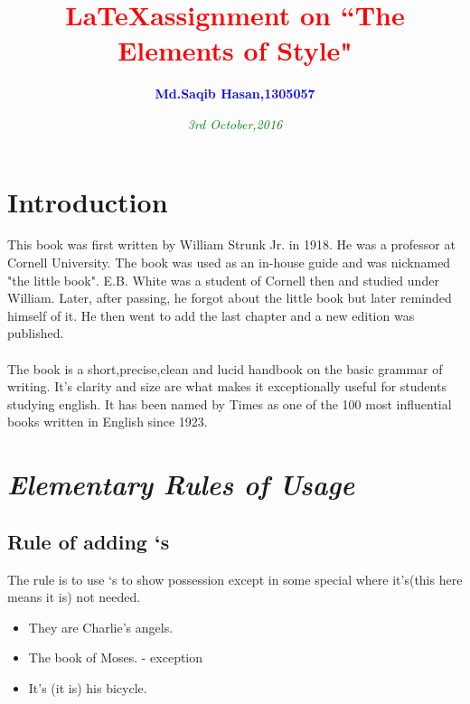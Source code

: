 \documentclass{report}
\begin{document}
\newcommand{\stylus}[1]{\textbf{\textit{#1}}}
\newcommand{\style}[2]{\textcolor{red}{#1} \textcolor{blue}{#2}}

\title{\textcolor{red}{\LaTeX assignment on ``The Elements of Style"}}
\author{\textcolor{blue}{\textbf{Md.Saqib Hasan,1305057}}}
\date{\textcolor{green}{\textit{3rd October,2016}}}
\maketitle
\newpage





\tableofcontents



\chapter{Introduction}
This book was first written by William Strunk Jr. in 1918. He was a professor at Cornell University. The book was used as an in-house guide and was nicknamed "the little book". E.B. White was a student of Cornell then and studied under William. Later, after passing, he forgot about the little book but later reminded himself of it. He then went to add the last chapter and a new edition was published.
\\
\\
The book is a short,precise,clean and lucid handbook on the basic grammar of writing. It's clarity and size are what makes it exceptionally useful for students studying english. It has been named by Times as one of the 100 most influential books written in English since 1923.



\chapter{\stylus{Elementary Rules of Usage}}
\section{Rule of adding `s}
The rule is to use `s to show possession except in some special where it's(this here means it is) not needed.
\begin{itemize}
\item They are Charlie's angels.
\item The book of Moses. - exception
\item It's (it is) his bicycle.
\end{itemize}
\end{document}
